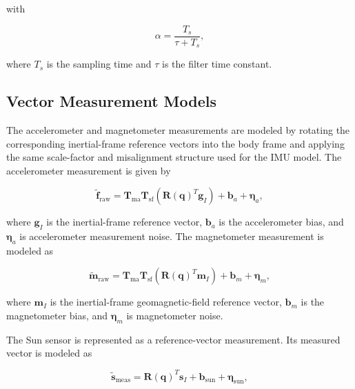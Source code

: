 with

\begin{equation}
    \alpha
    =
    \frac{T_s}{\tau + T_s},
    \label{eq:app_adcs_filter_alpha}
\end{equation}

where \(T_s\) is the sampling time and \(\tau\) is the filter time constant.

\subsection{Vector Measurement Models}
\label{app:adcs_vector_measurement_models}

The accelerometer and magnetometer measurements are modeled by rotating the corresponding inertial-frame reference vectors into the body frame and applying the same scale-factor and misalignment structure used for the IMU model. The accelerometer measurement is given by

\begin{equation}
    \tilde{\mathbf{f}}_{\mathrm{raw}}
    =
    \mathbf{T}_{\mathrm{ma}}
    \mathbf{T}_{\mathrm{sf}}
    \left(
        \mathbf{R}(\mathbf{q})^{T}
        \mathbf{g}_{I}
    \right)
    +
    \mathbf{b}_{a}
    +
    \boldsymbol{\eta}_{a},
    \label{eq:app_adcs_accelerometer_model}
\end{equation}

where \(\mathbf{g}_{I}\) is the inertial-frame reference vector, \(\mathbf{b}_{a}\) is the accelerometer bias, and \(\boldsymbol{\eta}_{a}\) is accelerometer measurement noise. The magnetometer measurement is modeled as

\begin{equation}
    \tilde{\mathbf{m}}_{\mathrm{raw}}
    =
    \mathbf{T}_{\mathrm{ma}}
    \mathbf{T}_{\mathrm{sf}}
    \left(
        \mathbf{R}(\mathbf{q})^{T}
        \mathbf{m}_{I}
    \right)
    +
    \mathbf{b}_{m}
    +
    \boldsymbol{\eta}_{m},
    \label{eq:app_adcs_magnetometer_model}
\end{equation}

where \(\mathbf{m}_{I}\) is the inertial-frame geomagnetic-field reference vector, \(\mathbf{b}_{m}\) is the magnetometer bias, and \(\boldsymbol{\eta}_{m}\) is magnetometer noise.

The Sun sensor is represented as a reference-vector measurement. Its measured vector is modeled as

\begin{equation}
    \tilde{\mathbf{s}}_{\mathrm{meas}}
    =
    \mathbf{R}(\mathbf{q})^{T}
    \mathbf{s}_{I}
    +
    \mathbf{b}_{\mathrm{sun}}
    +
    \boldsymbol{\eta}_{\mathrm{sun}},
    \label{eq:app_adcs_sun_sensor_model}
\end{equation}

